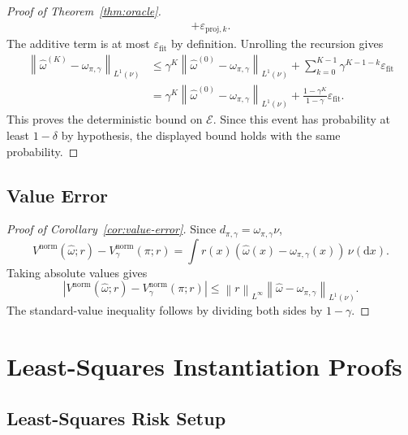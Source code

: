 \documentclass{article}
\newcommand{\1}{\mathbf{1}}
\newcommand{\dd}{\mathrm{d}}
\newcommand{\omegastar}{\omega_{\pi,\gamma}}
\newcommand{\omegahat}{\widehat{\omega}}
\newcommand{\norm}[2][]{\left\lVert #2 \right\rVert_{#1}}
\newcommand{\LoneNu}[1]{\norm[L^1(\nu)]{#1}}
\newcommand{\Linfty}[1]{\norm[L^\infty]{#1}}
\newcommand{\abs}[1]{\left\lvert #1 \right\rvert}
\theoremstyle{plain}
\theoremstyle{definition}
\theoremstyle{remark}
\begin{document}
\begin{proof}[Proof of Theorem~\ref{thm:oracle}]
\[\begin{aligned}
    +\varepsilon_{\mathrm{proj},k}.
\end{aligned}
\]
The additive term is at most $\varepsilon_{\mathrm{fit}}$ by definition.
Unrolling the recursion gives
\[
\begin{aligned}
    \LoneNu{\omegahat^{(K)}-\omegastar}
    &\le
    \gamma^K\LoneNu{\omegahat^{(0)}-\omegastar}
    +
    \sum_{k=0}^{K-1}\gamma^{K-1-k}\varepsilon_{\mathrm{fit}}\\
    &=
    \gamma^K\LoneNu{\omegahat^{(0)}-\omegastar}
    +
    \frac{1-\gamma^K}{1-\gamma}\varepsilon_{\mathrm{fit}}.
\end{aligned}
\]
This proves the deterministic bound on $\mathcal E$. Since this event has
probability at least $1-\delta$ by hypothesis, the displayed bound
holds with the same probability.
\end{proof}

\subsection{Value Error}

\begin{proof}[Proof of Corollary~\ref{cor:value-error}]
Since $d_{\pi,\gamma}=\omegastar\nu$,
\[
    V^{\mathrm{norm}}(\widehat\omega;r)-V_\gamma^{\mathrm{norm}}(\pi;r)
    =
    \int r(x)(\widehat\omega(x)-\omegastar(x))\,\nu(\dd x).
\]
Taking absolute values gives
\[
    \abs{V^{\mathrm{norm}}(\widehat\omega;r)-V_\gamma^{\mathrm{norm}}(\pi;r)}
    \leq
    \Linfty{r}\LoneNu{\widehat\omega-\omegastar}.
\]
The standard-value inequality follows by dividing both sides by $1-\gamma$.
\end{proof}


\section{Least-Squares Instantiation Proofs}
\label{app:least-squares}

\subsection{Least-Squares Risk Setup}
\end{document}
